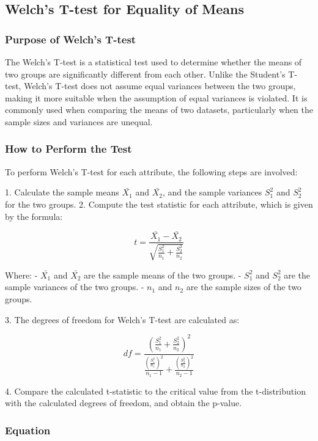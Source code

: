 \documentclass[11pt]{article}
\begin{document}
\subsection{Welch's T-test for Equality of Means}

\subsubsection{Purpose of Welch's T-test}

The Welch’s T-test is a statistical test used to determine whether the means of two groups are significantly different from each other. Unlike the Student’s T-test, Welch’s T-test does not assume equal variances between the two groups, making it more suitable when the assumption of equal variances is violated. It is commonly used when comparing the means of two datasets, particularly when the sample sizes and variances are unequal.

\subsubsection{How to Perform the Test}

To perform Welch’s T-test for each attribute, the following steps are involved:

1. Calculate the sample means \( \bar{X_1} \) and \( \bar{X_2} \), and the sample variances \( S_1^2 \) and \( S_2^2 \) for the two groups.
2. Compute the test statistic for each attribute, which is given by the formula:

\[
t = \frac{\bar{X_1} - \bar{X_2}}{\sqrt{\frac{S_1^2}{n_1} + \frac{S_2^2}{n_2}}}
\]

Where:
- \( \bar{X_1} \) and \( \bar{X_2} \) are the sample means of the two groups.
- \( S_1^2 \) and \( S_2^2 \) are the sample variances of the two groups.
- \( n_1 \) and \( n_2 \) are the sample sizes of the two groups.

3. The degrees of freedom for Welch’s T-test are calculated as:

\[
df = \frac{\left( \frac{S_1^2}{n_1} + \frac{S_2^2}{n_2} \right)^2}{\frac{\left( \frac{S_1^2}{n_1} \right)^2}{n_1 - 1} + \frac{\left( \frac{S_2^2}{n_2} \right)^2}{n_2 - 1}}
\]

4. Compare the calculated t-statistic to the critical value from the t-distribution with the calculated degrees of freedom, and obtain the p-value.

\subsubsection{Equation}
\end{document}
